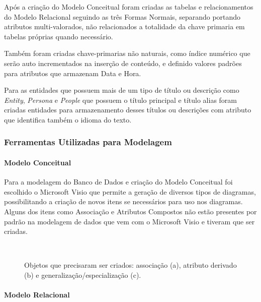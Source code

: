 \documentclass[12pt]{article}
\begin{document}
Após a criação do Modelo Conceitual foram criadas as tabelas e relacionamentos do Modelo Relacional seguindo as três Formas Normais, separando portando atributos multi-valorados, não relacionados a totalidade da chave primaria em tabelas próprias quando necessário.

Também foram criadas chave-primarias não naturais, como índice numérico que serão auto incrementados na inserção de conteúdo, e definido valores padrões para atributos que armazenam Data e Hora.

Para as entidades que possuem mais de um tipo de título ou descrição como \textit{Entity}, \textit{Persona} e \textit{People} que possuem o título principal e título alias foram criadas entidades para armazenamento desses títulos ou descrições com atributo que identifica também o idioma do texto.


\subsubsection{Ferramentas Utilizadas para Modelagem}

\paragraph{Modelo Conceitual\newline}

Para a modelagem do Banco de Dados e criação do Modelo Conceitual foi escolhido o Microsoft Visio que permite a geração de diversos tipos de diagramas, possibilitando a criação de novos itens se necessários para uso nos diagramas. Alguns dos itens como Associação e Atributos Compostos não estão presentes por padrão na modelagem de dados que vem com o Microsoft Visio e tiveram que ser criadas.

\begin{figure}[H]
\centering
\mbox{\quad
{}}
\caption{Objetos que precisaram ser criados: associação (a), atributo derivado (b) e generalização/especialização (c).}
\label{fig6}
\end{figure}

\paragraph{Modelo Relacional\newline}
\end{document}
